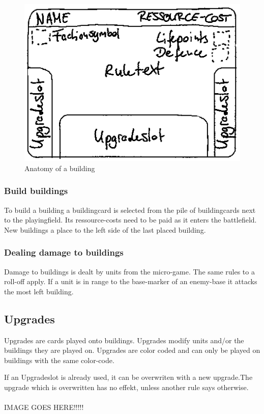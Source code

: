 \documentclass[a5paper,pagesize,10pt,bibtotoc,pointlessnumbers,
normalheadings,DIV=9,twoside=false]{scrbook}
\begin{document}
\begin{figure}[t]
\includegraphics[scale=0.6]{Building}
\centering
\caption{Anatomy of a building}
\end{figure}

\subsubsection{Build buildings}
To build a building a buildingcard is selected from the pile of buildingcards next to the playingfield. Its ressource-costs need to be paid as it enters the battlefield.
New buildings a place to the left side of the last placed building.

\subsubsection{Dealing damage to buildings}
Damage to buildings is dealt by units from the micro-game. The same rules to a roll-off apply. If a unit is in range to the base-marker of an enemy-base it attacks the most left building.

\subsection{Upgrades}
Upgrades are cards played onto buildings. Upgrades modify units and/or the buildings they are played on. Upgrades are color coded and can only be played on buildings with the same color-code.

If an Upgradeslot is already used, it can be overwriten with a new upgrade.The upgrade which is overwritten has no effekt, unless another rule says otherwise.\\
\\
IMAGE GOES HERE!!!!!
\end{document}
